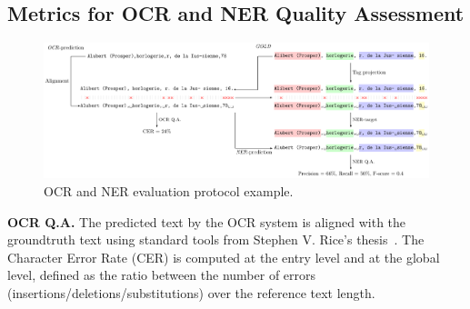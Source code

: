 
%
%
%






\subsection{Metrics for OCR and NER Quality Assessment}

\begin{figure}[tb]
    \includegraphics[width=\linewidth]{figs/eval-ocr-ner.pdf}
    \caption{OCR and NER evaluation protocol example.}
    \label{fig.eval-ocr-ner}
\end{figure}

\textbf{OCR Q.A.}  The predicted text by the OCR system is aligned with the groundtruth text using standard tools from
Stephen V. Rice's thesis~\cite{santos.2019.wcmel,neudecker.2021.whdip}. The Character Error Rate (CER) is computed at
the entry level and at the global level, defined as the ratio between the number of errors
(insertions/deletions/substitutions) over the reference text length. 

